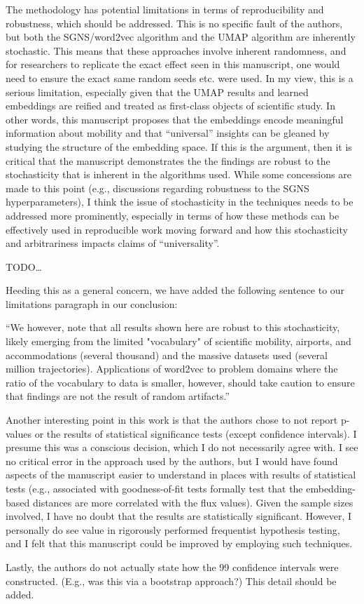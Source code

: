 \documentclass[12pt,a4paper]{article}
\newcommand{\response}[1]{{\leavevmode\noindent #1}}
\newcommand{\rcomment}[1]{%
\vspace{10pt}
\begin{tcolorbox}[colback=black!3,colframe=white!45!black]
#1
\end{tcolorbox}
}
\begin{document}
\rcomment{%
The methodology has potential limitations in terms of reproducibility and robustness, which should be addressed. This is no specific fault of the authors, but both the SGNS/word2vec algorithm and the UMAP algorithm are inherently stochastic. This means that these approaches involve inherent randomness, and for researchers to replicate the exact effect seen in this manuscript, one would need to ensure the exact same random seeds etc. were used. In my view, this is a serious limitation, especially given that the UMAP results and learned embeddings are reified and treated as first-class objects of scientific study. In other words, this manuscript proposes that the embeddings encode meaningful information about mobility and that “universal” insights can be gleaned by studying the structure of the embedding space. If this is the argument, then it is critical that the manuscript demonstrates the the findings are robust to the stochasticity that is inherent in the algorithms used. While some concessions are made to this point (e.g., discussions regarding robustness to the SGNS hyperparameters), I think the issue of stochasticity in the techniques needs to be addressed more prominently, especially in terms of how these methods can be effectively used in reproducible work moving forward and how this stochasticity and arbitrariness impacts claims of “universality”.
}

\response{%
TODO…

Heeding this as a general concern, we have added the following sentence to our limitations paragraph in our conclusion: 

“We however, note that all results shown here are robust to this stochasticity, likely emerging from the limited "vocabulary" of scientific mobility, airports, and accommodations (several thousand) and the massive datasets used (several million trajectories). Applications of word2vec to problem domains where the ratio of the vocabulary to data is smaller, however, should take caution to ensure that findings are not the result of random artifacts.”

}

\rcomment{%
Another interesting point in this work is that the authors chose to not report p-values or the results of statistical significance tests (except confidence intervals). I presume this was a conscious decision, which I do not necessarily agree with. I see no critical error in the approach used by the authors, but I would have found aspects of the manuscript easier to understand in places with results of statistical tests (e.g., associated with goodness-of-fit tests formally test that the embedding-based distances are more correlated with the flux values). Given the sample sizes involved, I have no doubt that the results are statistically significant. However, I personally do see value in rigorously performed frequentist hypothesis testing, and I felt that this manuscript could be improved by employing such techniques.

Lastly, the authors do not actually state how the 99 confidence intervals were constructed. (E.g., was this via a bootstrap approach?) This detail should be added.
}
\end{document}
